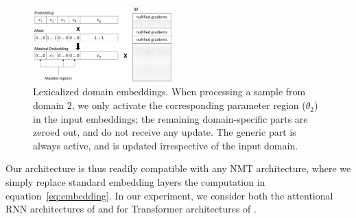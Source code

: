 \documentclass[11pt,a4paper]{article}
\begin{document}
\begin{figure}
  \center
  \includegraphics[width=0.48\textwidth]{embeddings}
  \caption{Lexicalized domain embeddings. When processing a sample from domain $2$, we only activate the corresponding parameter region ($\theta_2$) in the input embeddings; the remaining domain-specific parts are zeroed out, and do not receive any update. The generic part is always active, and is updated irrespective of the input domain.} 
  \label{fig:network}
\end{figure}

Our architecture is thus readily compatible with any NMT architecture, where we simply replace standard embedding layers the computation in equation~\ref{eq:embedding}. In our experiment, we consider both the attentional RNN architectures of \citet{Bahdanau15learning} and for Transformer architectures of \citet{Vaswani17attention}.

\end{document}
